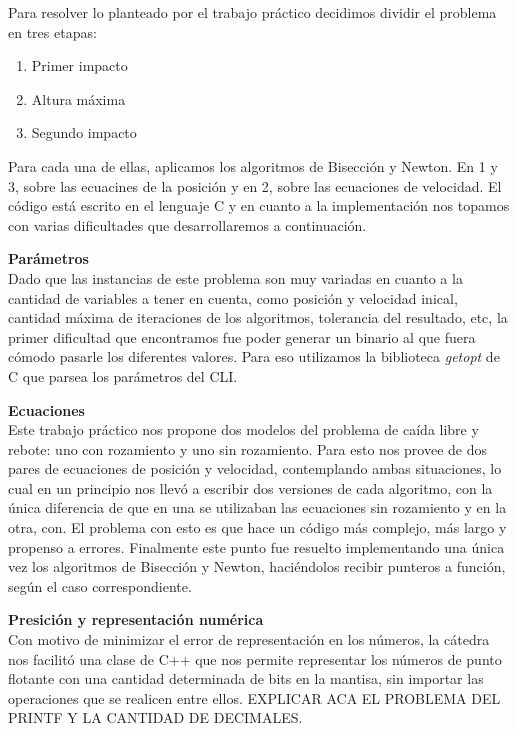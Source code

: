 \documentclass[a4paper]{article}
\begin{document}
Para resolver lo planteado por el trabajo práctico decidimos dividir el problema en tres etapas:
\begin{enumerate}
\item Primer impacto
\item Altura máxima
\item Segundo impacto
\end{enumerate}
Para cada una de ellas, aplicamos los algoritmos de Bisección y Newton. En 1 y 3, sobre las ecuacines de la posición y en 2, sobre las ecuaciones de velocidad.
El código está escrito en el lenguaje C y en cuanto a la implementación nos topamos con varias dificultades que desarrollaremos a continuación.
\begin{description}
\item \textbf{Parámetros}\\
Dado que las instancias de este problema son muy variadas en cuanto a la cantidad de variables a tener en cuenta, como posición y velocidad inical, cantidad máxima de iteraciones de los algoritmos, tolerancia del resultado, etc, la primer dificultad que encontramos fue poder generar un binario al que fuera cómodo pasarle los diferentes valores. Para eso utilizamos la biblioteca \textit{getopt} de C que parsea los parámetros del CLI.
\item \textbf{Ecuaciones}\\
Este trabajo práctico nos propone dos modelos del problema de caída libre y rebote: uno con rozamiento y uno sin rozamiento. Para esto nos provee de dos pares de ecuaciones de posición y velocidad, contemplando ambas situaciones, lo cual en un principio nos llevó a escribir dos versiones de cada algoritmo, con la única diferencia de que en una se utilizaban las ecuaciones sin rozamiento y en la otra, con.
El problema con esto es que hace un código más complejo, más largo y propenso a errores. Finalmente este punto fue resuelto implementando una única vez los algoritmos de Bisección y Newton, haciéndolos recibir punteros a función, según el caso correspondiente.
\item \textbf{Presición y representación numérica}\\
Con motivo de minimizar el error de representación en los números, la cátedra nos facilitó una clase de C++ que nos permite representar los números de punto flotante con una cantidad determinada de bits en la mantisa, sin importar las operaciones que se realicen entre ellos. EXPLICAR ACA EL PROBLEMA DEL PRINTF Y LA CANTIDAD DE DECIMALES.

\end{description} 
\end{document}
